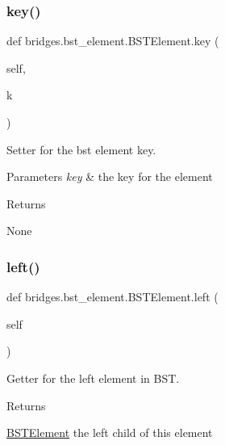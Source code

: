 \subsubsection{\texorpdfstring{key()}{key()}\hspace{0.1cm}{\footnotesize\ttfamily [2/2]}}
{\footnotesize\ttfamily def bridges.\+bst\+\_\+element.\+B\+S\+T\+Element.\+key (\begin{DoxyParamCaption}\item[{}]{self,  }\item[{}]{k }\end{DoxyParamCaption})}



Setter for the bst element key. 


\begin{DoxyParams}{Parameters}
{\em key} & the key for the element \\
\hline
\end{DoxyParams}
\begin{DoxyReturn}{Returns}


None 
\end{DoxyReturn}
\mbox{\label{classbridges_1_1bst__element_1_1_b_s_t_element_adb40ae0f98fe1cb7f153494c544d3f9f}} 
\subsubsection{\texorpdfstring{left()}{left()}\hspace{0.1cm}{\footnotesize\ttfamily [1/2]}}
{\footnotesize\ttfamily def bridges.\+bst\+\_\+element.\+B\+S\+T\+Element.\+left (\begin{DoxyParamCaption}\item[{}]{self }\end{DoxyParamCaption})}



Getter for the left element in B\+ST. 

\begin{DoxyReturn}{Returns}


\hyperlink{classbridges_1_1bst__element_1_1_b_s_t_element}{B\+S\+T\+Element} the left child of this element 
\end{DoxyReturn}
\mbox{\label{classbridges_1_1bst__element_1_1_b_s_t_element_a0b45e63b73faabb6b969dd6222e07942}} 
